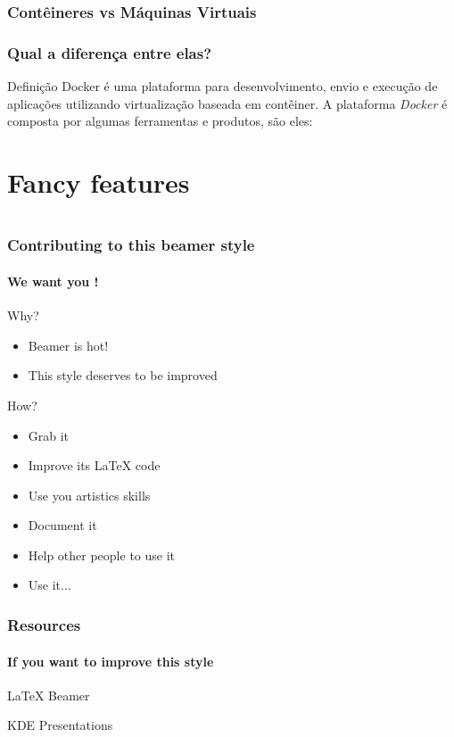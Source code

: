 \documentclass[12pt]{beamer}
\begin{document}
\begin{frame}
  \frametitle{Contêineres vs Máquinas Virtuais}
  \frametitle{Qual a diferença entre elas?}
  \begin{block}{Definição}
					Docker é uma plataforma para desenvolvimento, envio e execução de
					aplicações utilizando virtualização baseada em contêiner.
					A plataforma \emph{Docker} é composta por algumas ferramentas e
					produtos, são eles:
  \end{block}
\end{frame}

\section{Fancy features}

\section*{}
\begin{frame}
  \frametitle{Contributing to this beamer style}
  \framesubtitle{We want you !}

  \begin{block}{Why?}
  \begin{itemize}
    \item Beamer is hot!
    \item This style deserves to be improved
  \end{itemize}
  \end{block}

  \begin{block}{How?}
  \begin{itemize}
    \item Grab it
    \item Improve its LaTeX code
    \item Use you artistics skills
    \item Document it
    \item Help other people to use it
    \item Use it...
  \end{itemize}
  \end{block}
\end{frame}

\begin{frame}
  \frametitle{Resources}
  \framesubtitle{If you want to improve this style}
  \begin{thebibliography}{10}

  \beamertemplatearticlebibitems

    LaTeX Beamer

    KDE Presentations

  \end{thebibliography}
\end{frame}

\end{document}
